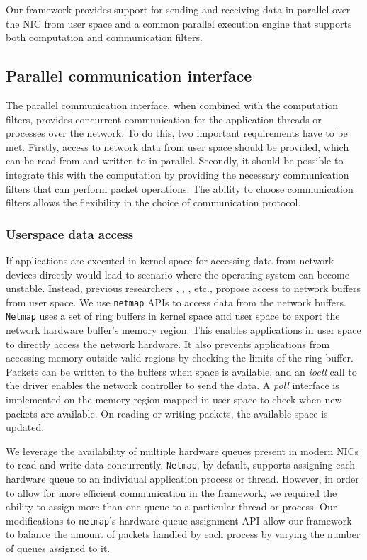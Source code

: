 \documentclass[10pt, conference, compsocconf, reqno]{IEEEtran}
\begin{document}
Our framework provides support for sending and receiving data in parallel over the NIC from user space and a common parallel execution engine that supports both computation and communication filters.

\subsection{Parallel communication interface}
\label{ppio}
The parallel communication interface, when combined with the computation filters, provides concurrent communication for the application threads or processes over the network. To do this, two important requirements have to be met. Firstly, access to network data from user space should be provided, which can be read from and written to in parallel. Secondly, it should be possible to integrate this with the computation by providing the necessary communication filters that can perform packet operations. The ability to choose communication filters allows the flexibility in the choice of communication protocol.

\subsubsection{Userspace data access}
If applications are executed in kernel space for accessing data from network devices directly would lead to scenario where the operating system can become unstable. Instead, previous researchers \cite{Rizzo:2012:RNI:2090147.2103536}, \cite{1564468}, \cite{Krasnyansky}, etc., propose access to network buffers from user space. We use \texttt{netmap} APIs \cite{Rizzo:2012:RNI:2090147.2103536} to access data from the network buffers. \texttt{Netmap} uses a set of ring buffers in kernel space and user space to export the network hardware buffer's memory region. This enables applications in user space to directly access the network hardware. It also prevents applications from accessing memory outside valid regions by checking the limits of the ring buffer. Packets can be written to the buffers when space is available, and an \textit{ioctl} call to the driver enables the network controller to send the data. A \textit{poll} interface is implemented on the memory region mapped in user space to check when new packets are available. On reading or writing packets, the available space is updated.

We leverage the availability of multiple hardware queues present in modern NICs to read and write data concurrently. \texttt{Netmap}, by default, supports assigning each hardware queue to an individual application process or thread. However, in order to allow for more efficient communication in the framework, we required the ability to assign more than one queue to a particular thread or process. Our modifications to \texttt{netmap}'s hardware queue assignment API allow our framework to balance the amount of packets handled by each process by varying the number of queues assigned to it.
\end{document}
